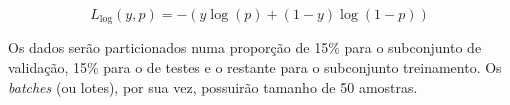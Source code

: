 \begin{equation}
    \label{eqn:cross-entropy-loss}
    L_{\log}(y, p) = -(y \log (p) + (1 - y) \log (1 - p))
\end{equation}


Os dados serão particionados numa proporção de 15\% para o subconjunto de validação, 15\% para o de testes e o restante para o subconjunto treinamento. Os \textit{batches} (ou lotes), por sua vez, possuirão tamanho de 50 amostras.





